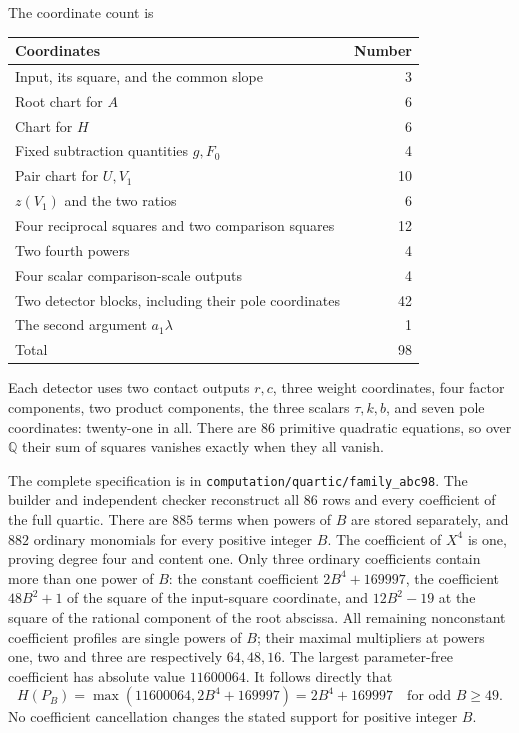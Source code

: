 \documentclass[11pt,a4paper]{article}
\newcommand{\Q}{\mathbb Q}\newcommand{\Z}{\mathbb Z}
\begin{document}
The coordinate count is
\begin{center}
\begin{tabular}{lr}
\toprule
Coordinates & Number\\\midrule
Input, its square, and the common slope &3\\
Root chart for $A$ &6\\
Chart for $H$ &6\\
Fixed subtraction quantities $g,F_0$ &4\\
Pair chart for $U,V_1$ &10\\
$z(V_1)$ and the two ratios &6\\
Four reciprocal squares and two comparison squares &12\\
Two fourth powers &4\\
Four scalar comparison-scale outputs &4\\
Two detector blocks, including their pole coordinates &42\\
The second argument $a_1\lambda$ &1\\\midrule
Total &98\\\bottomrule
\end{tabular}
\end{center}
Each detector uses two contact outputs $r,c$, three weight coordinates,
four factor components, two product components, the three scalars
$\tau,k,b$, and seven pole coordinates: twenty-one in all.
There are $86$ primitive quadratic equations, so over $\Q$ their
sum of squares vanishes exactly when they all vanish.

The complete specification is in
\nolinkurl{computation/quartic/family_abc98}. The builder and independent
checker reconstruct all $86$ rows and every coefficient of the full
quartic. There are $885$ terms when powers of $B$ are stored separately,
and $882$ ordinary monomials for every positive integer $B$.
The coefficient of $X^4$ is one, proving degree four and content one.
Only three ordinary coefficients contain more than one power of $B$:
the constant coefficient $2B^4+169997$, the coefficient
$48B^2+1$ of the square of the input-square coordinate, and $12B^2-19$
at the square of the rational component of the root abscissa.
All remaining nonconstant coefficient profiles are single powers of $B$;
their maximal multipliers at powers one, two and three are respectively
$64,48,16$. The largest parameter-free coefficient has absolute value
$11600064$. It follows directly that
\[
 H(P_B)=\max(11600064,2B^4+169997)
       =2B^4+169997\quad\text{for odd }B\ge49.
\]
No coefficient cancellation changes the stated support for positive integer $B$.
\end{document}
